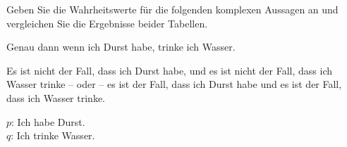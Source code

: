 \begin{frame}

Geben Sie die Wahrheitswerte für die folgenden komplexen Aussagen an und vergleichen Sie die Ergebnisse beider Tabellen.

\ea\label{ex:Equi1} Genau dann wenn ich Durst habe, trinke ich Wasser.

\ex\label{ex:Equi2} Es ist nicht der Fall, dass ich Durst habe, und es ist nicht der Fall, dass ich Wasser trinke -- oder -- es ist der Fall, dass ich Durst habe und es ist der Fall, dass ich Wasser trinke.
\z 

\pause

{\small $p$: Ich habe Durst.\\
	$q$: Ich trinke Wasser.}

\pause 

\begin{minipage}{0.35\textwidth}
	\centering
	
\end{minipage}
\pause
\begin{minipage}{0.55\textwidth}
	\centering
	
\end{minipage}

\end{frame}



